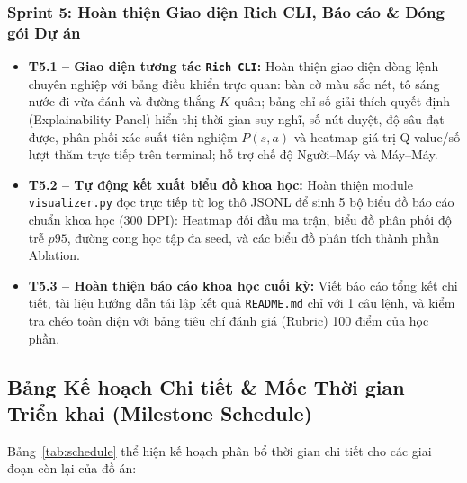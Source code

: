 \documentclass[a4paper,12pt]{report}
\begin{document}
\subsubsection{Sprint 5: Hoàn thiện Giao diện Rich CLI, Báo cáo \& Đóng gói Dự án}
\begin{itemize}
    \item \textbf{T5.1 -- Giao diện tương tác \texttt{Rich CLI}:} Hoàn thiện giao diện dòng lệnh chuyên nghiệp với bảng điều khiển trực quan: bàn cờ màu sắc nét, tô sáng nước đi vừa đánh và đường thắng $K$ quân; bảng chỉ số giải thích quyết định (Explainability Panel) hiển thị thời gian suy nghĩ, số nút duyệt, độ sâu đạt được, phân phối xác suất tiên nghiệm $P(s, a)$ và heatmap giá trị Q-value/số lượt thăm trực tiếp trên terminal; hỗ trợ chế độ Người--Máy và Máy--Máy.
    \item \textbf{T5.2 -- Tự động kết xuất biểu đồ khoa học:} Hoàn thiện module \texttt{visualizer.py} đọc trực tiếp từ log thô JSONL để sinh 5 bộ biểu đồ báo cáo chuẩn khoa học (300 DPI): Heatmap đối đầu ma trận, biểu đồ phân phối độ trễ $p95$, đường cong học tập đa seed, và các biểu đồ phân tích thành phần Ablation.
    \item \textbf{T5.3 -- Hoàn thiện báo cáo khoa học cuối kỳ:} Viết báo cáo tổng kết chi tiết, tài liệu hướng dẫn tái lập kết quả \texttt{README.md} chỉ với 1 câu lệnh, và kiểm tra chéo toàn diện với bảng tiêu chí đánh giá (Rubric) 100 điểm của học phần.
\end{itemize}

\subsection{Bảng Kế hoạch Chi tiết \& Mốc Thời gian Triển khai (Milestone Schedule)}
Bảng~\ref{tab:schedule} thể hiện kế hoạch phân bổ thời gian chi tiết cho các giai đoạn còn lại của đồ án:
\end{document}
